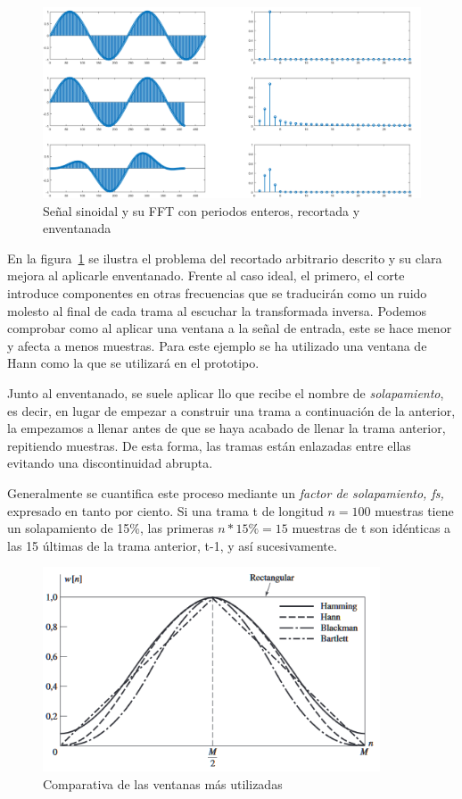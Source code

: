\begin{figure}[!ht]
\begin{center}
\includegraphics[width=14cm]{img/problem_fft.png}
\caption{Señal sinoidal y su FFT con periodos enteros, recortada y enventanada}
\label{fig:probfft}
\end{center}
\end{figure}

En la figura~\ref{fig:probfft} se ilustra el problema del recortado arbitrario descrito y su clara mejora al aplicarle enventanado. Frente al caso ideal, el primero, el corte introduce componentes en otras frecuencias que se traducirán como un ruido molesto al final de cada trama al escuchar la transformada inversa. Podemos comprobar como al aplicar una ventana a la señal de entrada, este se hace menor y afecta a menos muestras. Para este ejemplo se ha utilizado una ventana de Hann como la que se utilizará en el prototipo.

Junto al enventanado, se suele aplicar llo que recibe el nombre de  \emph{solapamiento}, es decir, en lugar de empezar a construir una trama a continuación de la anterior, la empezamos a llenar antes de que se haya acabado de llenar la trama anterior, repitiendo muestras. De esta forma, las tramas están enlazadas entre ellas evitando una discontinuidad abrupta.

Generalmente se cuantifica este proceso mediante un \emph{factor de solapamiento, fs,} expresado en tanto por ciento. Si una trama t de longitud $n = 100$ muestras tiene un solapamiento de 15\%, las primeras $n*15\% = 15$ muestras de t son idénticas a las 15 últimas de la trama anterior, t-1, y así sucesivamente.

\begin{figure}[!b]
\begin{center}
\includegraphics[width=10cm]{img/ventanas_grafica.png}
\caption{Comparativa de las ventanas más utilizadas}
\label{fig:compven}
\end{center}
\end{figure}

